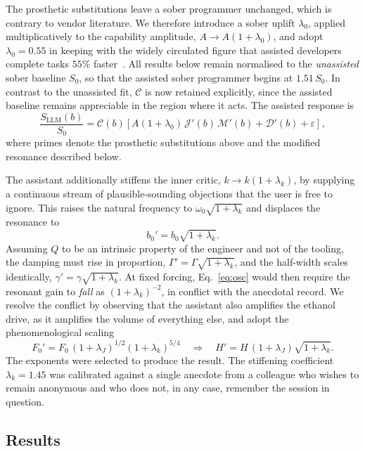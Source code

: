 \documentclass[11pt]{article}
\newcommand{\J}{\mathcal{J}}
\newcommand{\M}{\mathcal{M}}
\newcommand{\C}{\mathcal{C}}
\newcommand{\D}{\mathcal{D}}
\begin{document}
The prosthetic substitutions leave a sober programmer unchanged, which is contrary to vendor literature. We therefore introduce a sober uplift $\lambda_0$, applied multiplicatively to the capability amplitude, $A \to A(1+\lambda_0)$, and adopt $\lambda_0 = 0.55$ in keeping with the widely circulated figure that assisted developers complete tasks $55\%$ faster~\citep{copilot55}. All results below remain normalised to the \emph{unassisted} sober baseline $S_0$, so that the assisted sober programmer begins at $1.51\,S_0$. In contrast to the unassisted fit, $\C$ is now retained explicitly, since the assisted baseline remains appreciable in the region where it acts. The assisted response is
\begin{equation}
\frac{S_\mathrm{LLM}(b)}{S_0} = \C(b)\left[A(1+\lambda_0)\,\J'(b)\,\M'(b) + \D'(b) + \varepsilon\right],
\label{eq:assisted}
\end{equation}
where primes denote the prosthetic substitutions above and the modified resonance described below.

The assistant additionally stiffens the inner critic, $k \to k(1 + \lambda_k)$, by supplying a continuous stream of plausible-sounding objections that the user is free to ignore. This raises the natural frequency to $\omega_0\sqrt{1+\lambda_k}$ and displaces the resonance to
\begin{equation}
b_0' = b_0\sqrt{1 + \lambda_k}.
\end{equation}
Assuming $Q$ to be an intrinsic property of the engineer and not of the tooling, the damping must rise in proportion, $\Gamma' = \Gamma\sqrt{1+\lambda_k}$, and the half-width scales identically, $\gamma' = \gamma\sqrt{1+\lambda_k}$. At fixed forcing, Eq.~\eqref{eq:osc} would then require the resonant gain to \emph{fall} as $(1+\lambda_k)^{-2}$, in conflict with the anecdotal record. We resolve the conflict by observing that the assistant also amplifies the ethanol drive, as it amplifies the volume of everything else, and adopt the phenomenological scaling
\begin{equation}
F_0' = F_0\,(1+\lambda_J)^{1/2}(1+\lambda_k)^{5/4}
\quad\Longrightarrow\quad
H' = H\,(1+\lambda_J)\sqrt{1+\lambda_k}.
\end{equation}
The exponents were selected to produce the result. The stiffening coefficient $\lambda_k = 1.45$ was calibrated against a single anecdote from a colleague who wishes to remain anonymous and who does not, in any case, remember the session in question.

\subsection{Results}
\end{document}
